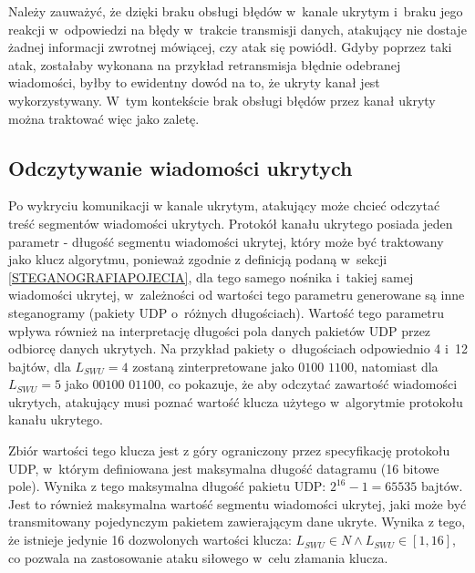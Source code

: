 \documentclass[a4paper, twoside, 12pt]{report}
\begin{document}
       Należy zauważyć, że dzięki braku obsługi błędów w~kanale ukrytym
       i~braku jego reakcji w~odpowiedzi na błędy w~trakcie transmisji danych, atakujący
       nie dostaje żadnej informacji zwrotnej mówiącej, czy atak się powiódł. Gdyby
       poprzez taki atak, zostałaby wykonana na przykład retransmisja błędnie odebranej
       wiadomości, byłby to ewidentny dowód na to, że ukryty kanał jest wykorzystywany.
       W~tym kontekście brak obsługi błędów przez kanał ukryty można traktować więc
       jako zaletę.

       \subsection{Odczytywanie wiadomości ukrytych}
       Po wykryciu komunikacji w kanale ukrytym, atakujący może chcieć
       odczytać treść segmentów wiadomości ukrytych. Protokół kanału ukrytego posiada
       jeden parametr - długość segmentu wiadomości ukrytej, który
       może być traktowany jako klucz algorytmu, ponieważ zgodnie z definicją podaną
       w~sekcji \ref{STEGANOGRAFIAPOJECIA}, dla tego samego nośnika i~takiej samej
       wiadomości ukrytej, w~zależności od wartości tego parametru generowane są
       inne steganogramy (pakiety UDP o~różnych długościach). Wartość tego parametru wpływa również
       na interpretację długości pola danych pakietów UDP przez odbiorcę danych ukrytych.
       Na przykład pakiety o~długościach odpowiednio 4 i~12 bajtów, dla \( L_{SWU} = 4 \)
       zostaną zinterpretowane jako \( 0100 \) \( 1100 \), natomiast dla \( L_{SWU} = 5 \)
       jako \( 00100 \) \( 01100 \), co pokazuje, że aby odczytać zawartość wiadomości
       ukrytych, atakujący musi poznać wartość klucza użytego w~algorytmie protokołu
       kanału ukrytego.

       Zbiór wartości tego
       klucza jest z góry ograniczony przez specyfikację protokołu UDP, w~którym
       definiowana jest maksymalna długość datagramu (16 bitowe pole).
       Wynika z tego maksymalna długość pakietu UDP: \(2^{16} - 1 = 65535\) bajtów. Jest to również maksymalna
       wartość segmentu wiadomości ukrytej, jaki może być transmitowany pojedynczym
       pakietem zawierającym dane ukryte. Wynika z tego, że istnieje jedynie 16
       dozwolonych wartości klucza: \( L_{SWU} \in N \land L_{SWU} \in [1, 16] \),
       co pozwala na zastosowanie ataku siłowego w~celu złamania klucza.
\end{document}
